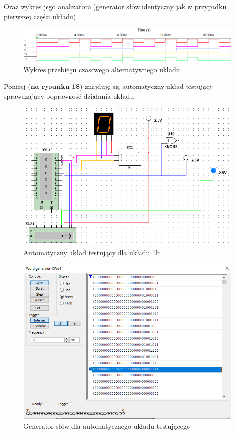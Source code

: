 \documentclass{article}
\begin{document}
Oraz wykres jego analizatora (generator słów identyczny jak w przypadku pierwszej części układu)

\begin{figure}[H]
    \centering
    \includegraphics[width=\textwidth]{analiza_2.png}
    \caption{Wykres przebiegu czasowego alternatywnego układu}
\end{figure}

Poniżej (\textbf{na rysunku 18}) znajduję się automatyczny układ testujący sprawdzający poprawność działania układu

\begin{figure}[H]
    \centering
    \includegraphics[width=\textwidth]{test_2.png}
    \caption{Automatyczny układ testujący dla układu 1b}
\end{figure}

\begin{figure}[H]
    \centering
    \includegraphics[width=\textwidth]{generator_test_2.png}
    \caption{Generator słów dla automatycznego układu testującego}
\end{figure}
\end{document}
